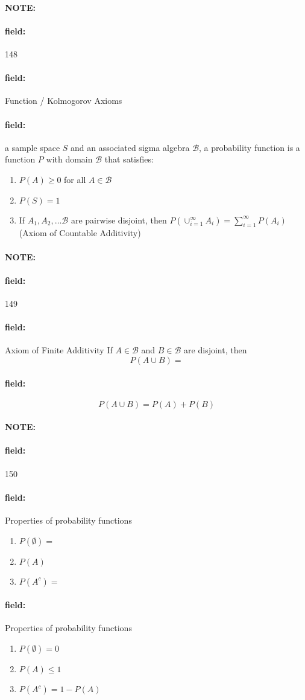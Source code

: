 \documentclass[12pt]{article}
\newenvironment{note}{\paragraph{NOTE:}}{}
\newenvironment{field}{\paragraph{field:}}{}
\begin{document}
\begin{note} \begin{field} \tiny 148 \end{field}
    \begin{field}
         Function / Kolmogorov Axioms
    \end{field}
    \begin{field}
         a sample space $S$ and an associated sigma algebra $\mathcal{B}$, a probability function is a function $P$ with domain $\mathcal{B}$ that satisfies:
            \begin{enumerate}
              \item $P(A) \geq 0$ for all $A \in \mathcal{B}$
              \item $P(S) = 1$
              \item If $A_1, A_2, \ldots \mathcal{B}$ are pairwise disjoint, then $P(\cup_{i=1}^\infty A_i) = \sum_{i=1}^\infty P(A_i)$ (Axiom of Countable Additivity)
            \end{enumerate}
    \end{field}
\end{note}

\begin{note} \begin{field} \tiny 149 \end{field}
    \begin{field}
      Axiom of Finite Additivity
      If $A\in \mathcal{B}$ and $B \in \mathcal{B}$ are disjoint, then
          $$P(A\cup B) =$$

    \end{field}
    \begin{field}
        $$P(A\cup B) = P(A) + P(B) $$
    \end{field}
\end{note}

\begin{note} \begin{field} \tiny 150 \end{field}
    \begin{field}
        Properties of probability functions
        \begin{enumerate}
              \item $P(\emptyset) = $
              \item $P(A) $
              \item $P(A^c) = $
            \end{enumerate}
    \end{field}
    \begin{field}
      Properties of probability functions
        \begin{enumerate}
              \item $P(\emptyset) = 0$
              \item $P(A) \leq 1$
              \item $P(A^c) = 1 - P(A)$
            \end{enumerate}
    \end{field}
\end{note}
\end{document}
